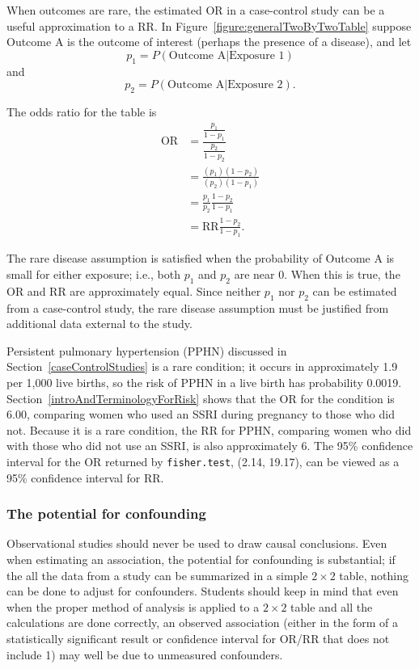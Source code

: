 When outcomes are rare, the estimated OR in a case-control study can be a useful approximation to a RR. In Figure~\ref{figure:generalTwoByTwoTable} suppose Outcome A is the outcome of interest (perhaps the presence of a disease), and let 
\[
  p_1 = P(\text{Outcome A} | \text{Exposure 1})
\]
and
\[
  p_2 = P(\text{Outcome A} | \text{Exposure 2}). 
\]

The odds ratio for the table is 
\begin{align*}
  \text{OR} &= \dfrac{\frac{p_1}{1 - p_1}}{\frac{p_2}{1 - p_2}} \\
            &= \frac{(p_1)(1 - p_2)}{(p_2)(1 - p_1)} \\
            &= \frac{p_1}{p_2} \frac{1 - p_2}{1 - p_1} \\
            &= \text{RR} \frac{1 - p_2}{1 - p_1}. 
\end{align*}

The rare disease assumption is satisfied when the probability of Outcome A is small for either exposure; i.e., both $p_1$ and $p_2$ are near 0. When this is true, the OR and RR are approximately equal. Since neither $p_1$ nor $p_2$ can be estimated from a case-control study, the rare disease assumption must be justified from additional data external to the study.

Persistent pulmonary hypertension (PPHN) discussed in Section~\ref{caseControlStudies} is a rare condition; it occurs in approximately 1.9 per 1,000 live births, so the risk of PPHN in a live birth has probability 0.0019. Section~\ref{introAndTerminologyForRisk} shows that the OR for the condition is 6.00, comparing women who used an SSRI during pregnancy to those who did not.  Because it is a rare condition, the RR for PPHN, comparing women who did with those who did not use an SSRI, is also approximately 6.  The 95\% confidence interval for the OR returned by \texttt{fisher.test}, (2.14, 19.17), can be viewed as a 95\% confidence interval for RR.

\subsubsection{The potential for confounding}

Observational studies should never be used to draw causal conclusions.  Even when estimating an association, the potential for confounding is substantial; if the all the data from a study can be summarized in a simple $2 \times 2$ table, nothing can be done to adjust for confounders.  Students should keep in mind that even when the proper method of analysis is applied to a $2 \times 2$ table and all the calculations are done correctly, an observed association (either in the form of a statistically significant result or confidence interval for OR/RR that does not include 1) may well be due to unmeasured confounders.  


